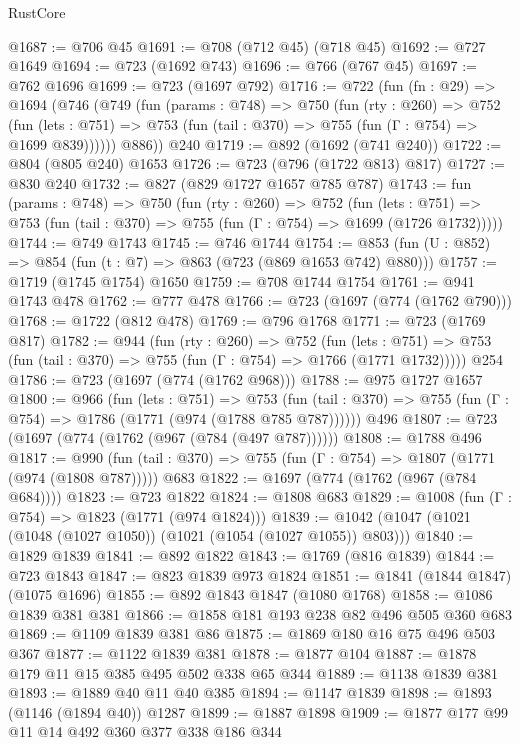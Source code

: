 \begin{lexlean}{RustCore}
\begin{coremodule}
@1687 := @706 @45
@1691 := @708 (@712 @45) (@718 @45)
@1692 := @727 @1649
@1694 := @723 (@1692 @743)
@1696 := @766 (@767 @45)
@1697 := @762 @1696
@1699 := @723 (@1697 @792)
@1716 := @722
    (fun (fn : @29) =>
    @1694
      (@746
        (@749
          (fun (params : @748) =>
          @750
            (fun (rty : @260) =>
            @752
              (fun (lets : @751) =>
              @753 (fun (tail : @370) => @755 (fun (Γ : @754) => @1699 @839))))))
        @886))
    @240
@1719 := @892 (@1692 (@741 @240))
@1722 := @804 (@805 @240) @1653
@1726 := @723 (@796 (@1722 @813) @817)
@1727 := @830 @240
@1732 := @827 (@829 @1727 @1657 @785 @787)
@1743 := fun (params : @748) =>
  @750
    (fun (rty : @260) =>
    @752
      (fun (lets : @751) =>
      @753 (fun (tail : @370) => @755 (fun (Γ : @754) => @1699 (@1726 @1732)))))
@1744 := @749 @1743
@1745 := @746 @1744
@1754 := @853 (fun (U : @852) => @854 (fun (t : @7) => @863 (@723 (@869 @1653 @742) @880)))
@1757 := @1719 (@1745 @1754) @1650
@1759 := @708 @1744 @1754
@1761 := @941 @1743 @478
@1762 := @777 @478
@1766 := @723 (@1697 (@774 (@1762 @790)))
@1768 := @1722 (@812 @478)
@1769 := @796 @1768
@1771 := @723 (@1769 @817)
@1782 := @944
    (fun (rty : @260) =>
    @752
      (fun (lets : @751) =>
      @753 (fun (tail : @370) => @755 (fun (Γ : @754) => @1766 (@1771 @1732)))))
    @254
@1786 := @723 (@1697 (@774 (@1762 @968)))
@1788 := @975 @1727 @1657
@1800 := @966
    (fun (lets : @751) =>
    @753 (fun (tail : @370) => @755 (fun (Γ : @754) => @1786 (@1771 (@974 (@1788 @785 @787))))))
    @496
@1807 := @723 (@1697 (@774 (@1762 (@967 (@784 (@497 @787))))))
@1808 := @1788 @496
@1817 := @990 (fun (tail : @370) => @755 (fun (Γ : @754) => @1807 (@1771 (@974 (@1808 @787))))) @683
@1822 := @1697 (@774 (@1762 (@967 (@784 @684))))
@1823 := @723 @1822
@1824 := @1808 @683
@1829 := @1008 (fun (Γ : @754) => @1823 (@1771 (@974 @1824)))
@1839 := @1042 (@1047 (@1021 (@1048 (@1027 @1050)) (@1021 (@1054 (@1027 @1055)) @803)))
@1840 := @1829 @1839
@1841 := @892 @1822
@1843 := @1769 (@816 @1839)
@1844 := @723 @1843
@1847 := @823 @1839 @973 @1824
@1851 := @1841 (@1844 @1847) (@1075 @1696)
@1855 := @892 @1843 @1847 (@1080 @1768)
@1858 := @1086 @1839 @381 @381
@1866 := @1858 @181 @193 @238 @82 @496 @505 @360 @683
@1869 := @1109 @1839 @381 @86
@1875 := @1869 @180 @16 @75 @496 @503 @367
@1877 := @1122 @1839 @381
@1878 := @1877 @104
@1887 := @1878 @179 @11 @15 @385 @495 @502 @338 @65 @344
@1889 := @1138 @1839 @381
@1893 := @1889 @40 @11 @40 @385
@1894 := @1147 @1839
@1898 := @1893 (@1146 (@1894 @40)) @1287
@1899 := @1887 @1898
@1909 := @1877 @177 @99 @11 @14 @492 @360 @377 @338 @186 @344

\end{coremodule}
\end{lexlean}
